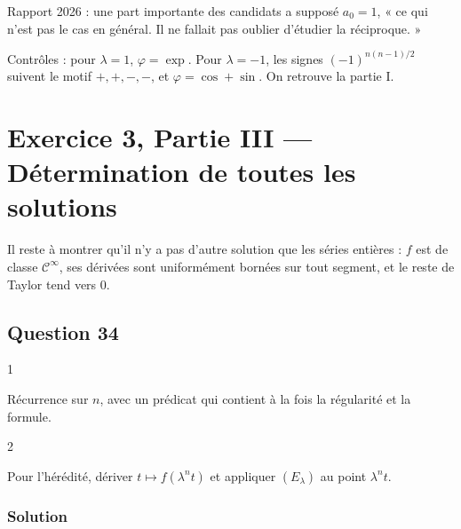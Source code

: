 \documentclass[11pt,a4paper]{article}
\begin{document}
\begin{jury}

Rapport 2026 : une part importante des candidats a supposé \(a_0=1\), « ce qui n'est pas le cas en général. Il ne fallait pas oublier d'étudier la réciproque. »

\end{jury}

\begin{methode}

Contrôles : pour \(\lambda=1\), \(\varphi=\exp\). Pour \(\lambda=-1\), les signes \((-1)^{n(n-1)/2}\) suivent le motif \(+,+,-,-\), et \(\varphi=\cos+\sin\). On retrouve la partie I.

\end{methode}

\hypertarget{exercice-3-partie-iii-duxe9termination-de-toutes-les-solutions}{%
\section{Exercice 3, Partie III --- Détermination de toutes les solutions}\label{exercice-3-partie-iii-duxe9termination-de-toutes-les-solutions}}

Il reste à montrer qu'il n'y a pas d'autre solution que les séries entières : \(f\) est de classe \(\mathcal C^\infty\), ses dérivées sont uniformément bornées sur tout segment, et le reste de Taylor tend vers \(0\).

\hypertarget{question-34}{%
\subsection{Question 34}\label{question-34}}

\begin{indication}{1}

Récurrence sur \(n\), avec un prédicat qui contient à la fois la régularité et la formule.

\end{indication}

\begin{indication}{2}

Pour l'hérédité, dériver \(t\mapsto f(\lambda^nt)\) et appliquer \((E_\lambda)\) au point \(\lambda^nt\).

\end{indication}

\hypertarget{solution-33}{%
\subsubsection{Solution}\label{solution-33}}
\end{document}
